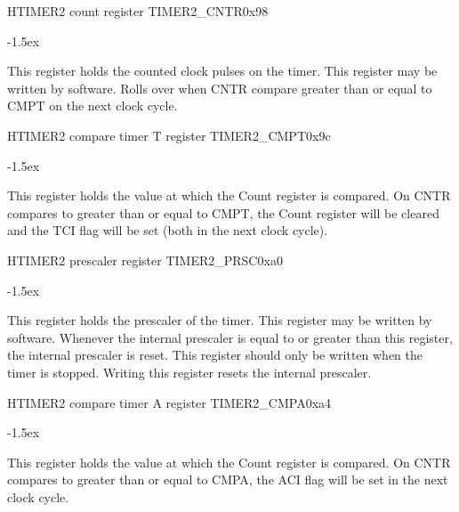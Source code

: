 \documentclass[12pt]{article}
\begin{document}
\begin{register}{H}{TIMER2 count register TIMER2\_CNTR}{0x98}
\label{timer2cntr}
%
%
\regnewline%
\end{register}
\begin{regdesc}[0.8\textwidth]\begin{reglist}[0000]
\itemsep-1.5ex
\item[CNTR] This register holds the counted clock pulses on the timer. This register may be written by software. Rolls over when CNTR compare greater than or equal to CMPT on the next clock cycle.
\end{reglist}\end{regdesc}

\begin{register}{H}{TIMER2 compare timer T register TIMER2\_CMPT}{0x9c}
\label{timer2cmpt}
%
%
\regnewline%
\end{register}
\begin{regdesc}[0.8\textwidth]\begin{reglist}[0000]
\itemsep-1.5ex
\item[CMPT] This register holds the value at which the Count register is compared. On CNTR compares to greater than or equal to CMPT, the Count register will be cleared and the TCI flag will be set (both in the next clock cycle).
\end{reglist}\end{regdesc}

\begin{register}{H}{TIMER2 prescaler register TIMER2\_PRSC}{0xa0}
\label{timer2prsc}
%
%
\regnewline%
\end{register}
\begin{regdesc}[0.8\textwidth]\begin{reglist}[0000]
\itemsep-1.5ex
\item[PRSC] This register holds the prescaler of the timer. This register may be written by software. Whenever the internal prescaler is equal to or greater than this register, the internal prescaler is reset. This register should only be written when the timer is stopped. Writing this register resets the internal prescaler.
\end{reglist}\end{regdesc}

\begin{register}{H}{TIMER2 compare timer A register TIMER2\_CMPA}{0xa4}
\label{timer2cmpa}
%
%
\regnewline%
\end{register}
\begin{regdesc}[0.8\textwidth]\begin{reglist}[0000]
\itemsep-1.5ex
\item[CMPA] This register holds the value at which the Count register is compared. On CNTR compares to greater than or equal to CMPA, the ACI flag will be set in the next clock cycle.
\end{reglist}\end{regdesc}
\end{document}
